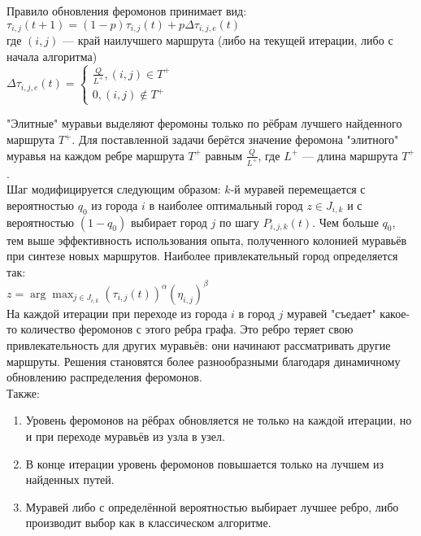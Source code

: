 \documentclass[14pt]{article}
\begin{document}
Правило обновления феромонов принимает вид:\\

$\tau_{i,j}(t+1)=(1-p)\tau_{i,j}(t)+p\Delta\tau_{i,j,e}(t)$\\

где $(i,j)$ --- край наилучшего маршрута (либо на текущей итерации, либо с начала алгоритма)\\

$\Delta\tau_{i,j,e}(t)=\begin{cases}
    \frac{Q}{L^+}, (i,j) \in T^+\\
    0, (i,j) \notin T^+
\end{cases}$

"Элитные" муравьи выделяют феромоны только по рёбрам лучшего найденного маршрута $T^+$. Для поставленной задачи берётся значение феромона "элитного" муравья на каждом ребре маршрута $T^+$ равным $\frac{Q}{L^+}$, где $L^+$ --- длина маршрута $T^+$.\\

Шаг модифицируется следующим образом: $k$-й муравей перемещается с вероятностью $q_0$ из города $i$ в наиболее оптимальный город $z \in J_{i,k}$ и с вероятностью $(1-q_0)$ выбирает город $j$ по шагу $P_{i,j,k}(t)$. Чем больше $q_0$, тем выше эффективность использования опыта, полученного колонией муравьёв при синтезе новых маршрутов. Наиболее привлекательный город определяется так:\\

$z=\arg \max_{j \in J_{i,k}} (\tau_{i,j}(t))^\alpha(\eta_{i,j})^\beta$\\

На каждой итерации при переходе из города $i$ в город $j$ муравей "съедает" какое-то количество феромонов с этого ребра графа. Это ребро теряет свою привлекательность для других муравьёв: они начинают рассматривать другие маршруты. Решения становятся более разнообразными благодаря динамичному обновлению распределения феромонов.\\
Также:\\
\begin{enumerate}
    \item Уровень феромонов на рёбрах обновляется не только на каждой итерации, но и при переходе муравьёв из узла в узел.
    \item В конце итерации уровень феромонов повышается только на лучшем из найденных путей.
    \item Муравей либо с определённой вероятностью выбирает лучшее ребро, либо производит выбор как в классическом алгоритме.
\end{enumerate}
\end{document}
